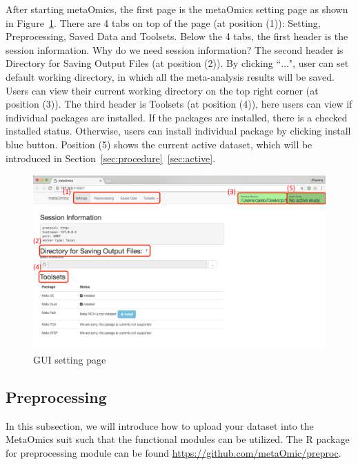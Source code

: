 
After starting metaOmics, 
the first page is the metaOmics setting page as shown in Figure~\ref{fig:GUIsetting}.  
There are 4 tabs on top of the page (at position {\color{red} (1)}): Setting, Preprocessing, Saved Data and Toolsets.
Below the 4 tabs, 
the first header is the session information.
{
\color{blue}
Why do we need session information?
}
The second header is Directory for Saving Output Files (at position {\color{red} (2)}).
By clicking ``$\ldots$",
user can set default working directory, in which all the meta-analysis results will be saved.
Users can view their current working directory on the top right corner (at position {\color{red} (3)}).
The third header is Toolsets (at position {\color{red} (4)}),
here users can view if individual packages are installed.
If the packages are installed, there is a checked installed status.
Otherwise, users can install individual package by clicking install blue button.
Position {\color{red} (5)} shows the current active dataset, which will be introduced in Section~\ref{sec:procedure}~\ref{sec:active}. 
 
\begin{figure}[H]
\begin{center}
\includegraphics[scale=0.4]{./figure/preprocessing/GUIsetting}
\caption{GUI setting page}
\label{fig:GUIsetting}
\end{center}
\end{figure}

\subsection{Preprocessing}

In this subsection, we will introduce how to upload your dataset into the MetaOmics suit such that the functional modules can be utilized.
The R package for preprocessing module can be found \url{https://github.com/metaOmic/preproc}.

